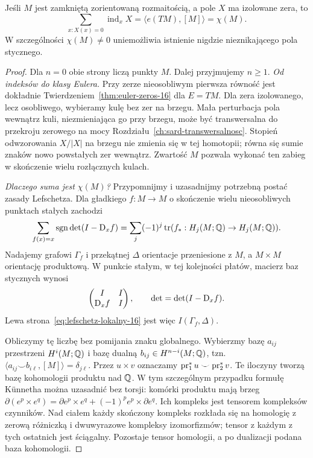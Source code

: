 \begin{twierdzenie}
\label{thm:poincare-hopf-16}
Jeśli $M$ jest
zamkniętą
zorientowaną rozmaitością,
a pole $X$ ma
izolowane zera, to
\begin{equation}\label{eq:poincare-hopf-16}
 \sum_{x:X(x)=0}
     \operatorname{ind}_x X
 =\langle e(TM),[M]\rangle
 =\chi(M).
\end{equation}
W szczególności
$\chi(M)\ne0$
uniemożliwia istnienie
nigdzie nieznikającego
pola stycznego.
\end{twierdzenie}
\begin{proof}
Dla $n=0$ obie strony liczą punkty $M$.
Dalej przyjmujemy $n\geq1$.
\emph{Od indeksów do klasy Eulera.}
Przy zerze nieosobliwym
pierwsza równość jest
dokładnie
Twierdzeniem~\ref{thm:euler-zeros-16}
dla $E=TM$. Dla zera
izolowanego, lecz
osobliwego, wybieramy
kulę bez zer na
brzegu. Mała perturbacja
pola wewnątrz kuli,
niezmieniająca go
przy brzegu, może być
transwersalna do
przekroju zerowego
na mocy
Rozdziału~\ref{ch:sard-transwersalnosc}.
Stopień odwzorowania
$X/|X|$ na brzegu
nie zmienia się
w tej homotopii;
równa się sumie
znaków nowo
powstałych zer
wewnątrz. Zwartość
$M$ pozwala wykonać
ten zabieg w
skończenie wielu
rozłącznych kulach.

\emph{Dlaczego suma jest $\chi(M)$?}
Przypomnijmy i uzasadnijmy
potrzebną postać
zasady Lefschetza.
Dla gładkiego
$f:M\to M$ o
skończenie wielu
nieosobliwych
punktach stałych
zachodzi
\begin{equation}\label{eq:lefschetz-lokalny-16}
 \sum_{f(x)=x}
    \operatorname{sgn}\det(I-\mathrm D_xf)
 =\sum_j(-1)^j
    \operatorname{tr}
      (f_*:H_j(M;\mathbb{Q})\to H_j(M;\mathbb{Q})).
\end{equation}
Nadajemy grafowi $\Gamma_f$ i przekątnej $\Delta$
orientacje przeniesione z $M$, a $M\times M$ orientację
produktową. W punkcie stałym, w tej kolejności płatów,
macierz baz stycznych wynosi
\[
 \begin{pmatrix}I&I\\\mathrm D_xf&I\end{pmatrix},
 \qquad \det=\det(I-\mathrm D_xf).
\]
Lewa strona~\eqref{eq:lefschetz-lokalny-16}
jest więc $I(\Gamma_f,\Delta)$.

Obliczymy tę liczbę bez pomijania znaku globalnego.
Wybierzmy bazę $a_{ij}$ przestrzeni $H^i(M;\mathbb{Q})$
i bazę dualną $b_{ij}\in H^{n-i}(M;\mathbb{Q})$, tzn.
$\langle a_{ij}\smile b_{i\ell},[M]\rangle=\delta_{j\ell}$.
Przez $u\times v$ oznaczamy
$\operatorname{pr}_1^*u\smile\operatorname{pr}_2^*v$. Te iloczyny tworzą bazę
kohomologii produktu nad $\mathbb{Q}$. W tym szczególnym
przypadku formułę Künnetha można uzasadnić bez torsji:
komórki produktu mają brzeg
$\partial(e^p\times e^q)=\partial e^p\times e^q+
(-1)^p e^p\times\partial e^q$.
Ich kompleks jest tensorem kompleksów czynników.
Nad ciałem każdy skończony kompleks rozkłada się na
homologię z zerową różniczką i dwuwyrazowe kompleksy
izomorfizmów; tensor z każdym z tych ostatnich
jest ściągalny. Pozostaje tensor homologii,
a po dualizacji podana baza kohomologii.


\end{proof}
